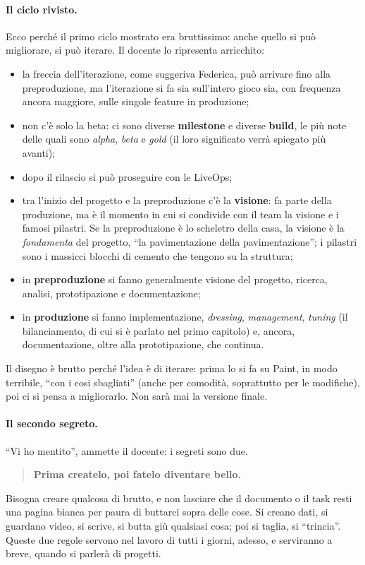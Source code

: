 \paragraph{Il ciclo rivisto.} Ecco perché il primo ciclo mostrato era
bruttissimo: anche quello si può migliorare, si può iterare. Il docente lo
ripresenta arricchito:
\begin{itemize}
  \item la freccia dell'iterazione, come suggeriva Federica, può arrivare fino
        alla preproduzione, ma l'iterazione si fa sia sull'intero gioco sia,
        con frequenza ancora maggiore, sulle singole feature in produzione;
  \item non c'è solo la beta: ci sono diverse \textbf{milestone} e diverse
        \textbf{build}, le più note delle quali sono \emph{alpha}, \emph{beta}
        e \emph{gold} (il loro significato verrà spiegato più avanti);
  \item dopo il rilascio si può proseguire con le LiveOps;
  \item tra l'inizio del progetto e la preproduzione c'è la \textbf{visione}:
        fa parte della produzione, ma è il momento in cui si condivide con il
        team la visione e i famosi pilastri. Se la preproduzione è lo
        scheletro della casa, la visione è la \emph{fondamenta} del progetto,
        ``la pavimentazione della pavimentazione''; i pilastri sono i massicci
        blocchi di cemento che tengono su la struttura;
  \item in \textbf{preproduzione} si fanno generalmente visione del progetto,
        ricerca, analisi, prototipazione e documentazione;
  \item in \textbf{produzione} si fanno implementazione, \emph{dressing},
        \emph{management}, \emph{tuning} (il bilanciamento, di cui si è
        parlato nel primo capitolo) e, ancora, documentazione, oltre alla
        prototipazione, che continua.
\end{itemize}
Il disegno è brutto perché l'idea è di iterare: prima lo si fa su Paint, in
modo terribile, ``con i cosi sbagliati'' (anche per comodità, soprattutto per
le modifiche), poi ci si pensa a migliorarlo. Non sarà mai la versione
finale.

\paragraph{Il secondo segreto.} ``Vi ho mentito'', ammette il docente: i
segreti sono due.
\begin{quote}
\centering
\textbf{Prima createlo, poi fatelo diventare bello.}
\end{quote}
Bisogna creare qualcosa di brutto, e non lasciare che il documento o il task
resti una pagina bianca per paura di buttarci sopra delle cose. Si creano
dati, si guardano video, si scrive, si butta giù qualsiasi cosa; poi si
taglia, si ``trincia''. Queste due regole servono nel lavoro di tutti i
giorni, adesso, e serviranno a breve, quando si parlerà di progetti.

